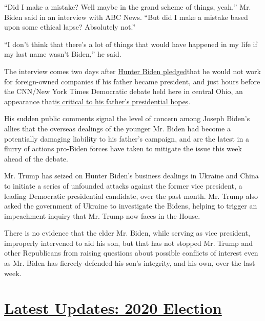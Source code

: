``Did I make a mistake? Well maybe in the grand scheme of things,
yeah,'' Mr. Biden said in an interview with ABC News. ``But did I make a
mistake based upon some ethical lapse? Absolutely not.''

``I don't think that there's a lot of things that would have happened in
my life if my last name wasn't Biden,'' he said.

The interview comes two days after
\href{https://www.nytimes.com/2019/10/13/us/politics/hunter-biden-china.html}{Hunter
Biden pledged}that he would not work for foreign-owned companies if his
father became president, and just hours before the CNN/New York Times
Democratic debate held here in central Ohio, an appearance
that\href{https://www.nytimes.com/2019/10/14/us/politics/joe-biden-democratic-debate.html}{is
critical to his father's presidential hopes}.

His sudden public comments signal the level of concern among Joseph
Biden's allies that the overseas dealings of the younger Mr. Biden had
become a potentially damaging liability to his father's campaign, and
are the latest in a flurry of actions pro-Biden forces have taken to
mitigate the issue this week ahead of the debate.

Mr. Trump has seized on Hunter Biden's business dealings in Ukraine and
China to initiate a series of unfounded attacks against the former vice
president, a leading Democratic presidential candidate, over the past
month. Mr. Trump also asked the government of Ukraine to investigate the
Bidens, helping to trigger an impeachment inquiry that Mr. Trump now
faces in the House.

There is no evidence that the elder Mr. Biden, while serving as vice
president, improperly intervened to aid his son, but that has not
stopped Mr. Trump and other Republicans from raising questions about
possible conflicts of interest even as Mr. Biden has fiercely defended
his son's integrity, and his own, over the last week.

\hypertarget{latest-updates-2020-election}{%
\section{\texorpdfstring{\href{https://www.nytimes.com/2020/07/31/us/elections/biden-vs-trump.html?action=click\&pgtype=Article\&state=default\&region=MAIN_CONTENT_1\&context=storylines_live_updates}{Latest
Updates: 2020
Election}}{Latest Updates: 2020 Election}}\label{latest-updates-2020-election}}

